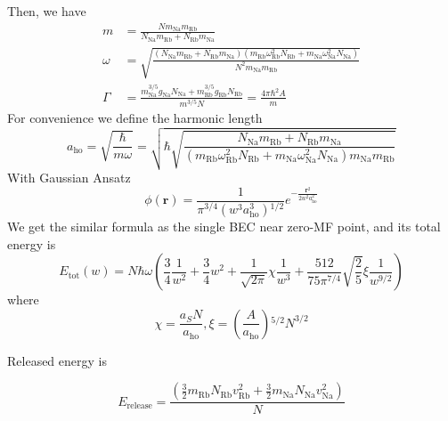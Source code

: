 Then, we have
\begin{equation}
\begin{split}
m&=\frac{N m_{\text{Na}}m_{\text{Rb}}}{N_{\text{Na}}m_{\text{Rb}}+N_{\text{Rb}}m_{\text{Na}}}\\
\omega&=\sqrt{\frac{\left(N_{\text{Na}}m_{\text{Rb}}+N_{\text{Rb}}m_{\text{Na}}\right)\left(m_{\text{Rb}}\omega_{\text{Rb}}^2N_{\text{Rb}}+m_{\text{Na}}\omega_{\text{Na}}^2N_{\text{Na}}\right)}{N^2m_{\text{Na}}m_{\text{Rb}}}}\\
\Gamma&=\frac{m_{\text{Na}}^{3/5}g_{\text{Na}}N_{\text{Na}}+m_{\text{Rb}}^{3/5}g_{\text{Rb}}N_{\text{Rb}}}{m^{3/5}N}=\frac{4\pi  \hbar ^2A}{m}
\end{split}
\end{equation}
For convenience we define the harmonic length
\begin{equation}
a_{\text{ho}}=\sqrt{\frac{\hbar }{m \omega }}=\sqrt{\hbar \sqrt{\frac{N_{\text{Na}}m_{\text{Rb}}+N_{\text{Rb}}m_{\text{Na}}}{\left(m_{\text{Rb}}
\omega _{\text{Rb}}^2N_{\text{Rb}}+m_{\text{Na}} \omega _{\text{Na}}^2N_{\text{Na}}\right)m_{\text{Na}}m_{\text{Rb}}}}}
\end{equation}
With Gaussian Ansatz
\begin{equation}
\phi (\pmb{r})=\frac{1}{\pi ^{3/4}\left(w^3a_{\text{ho}}^3\right){}^{1/2}}e^{-\frac{\pmb{r}^2}{2w^2a_{\text{ho}}^2}}
\end{equation}
We get the similar formula as the single BEC near zero-MF point, and its total energy is
\begin{equation}
E_{\text{tot}}(w)=N\hbar\omega\left(\frac{3}{4}\frac{1}{w^2}+\frac{3}{4}w^2+\frac{1}{\sqrt{2\pi}}\chi\frac{1}{w^3}+\frac{512}{75 \pi ^{7/4}}\sqrt{\frac{2}{5}}\xi\frac{1}{ w^{9/2}}\right)
\end{equation}
where
\begin{equation}
\chi =\frac{a_SN}{a_{\text{ho}}}, \xi =\left(\frac{A}{a_{\text{ho}}}\right){}^{5/2}N^{3/2}
\end{equation}



Released energy is

\begin{equation}E_{\text{release}}=\frac{\left(\frac{3}{2}m_{\text{Rb}}N_{\text{Rb}}v_{\text{Rb}}^2+\frac{3}{2}m_{\text{Na}}N_{\text{Na}}v_{\text{Na}}^2\right)}{N}\end{equation}

